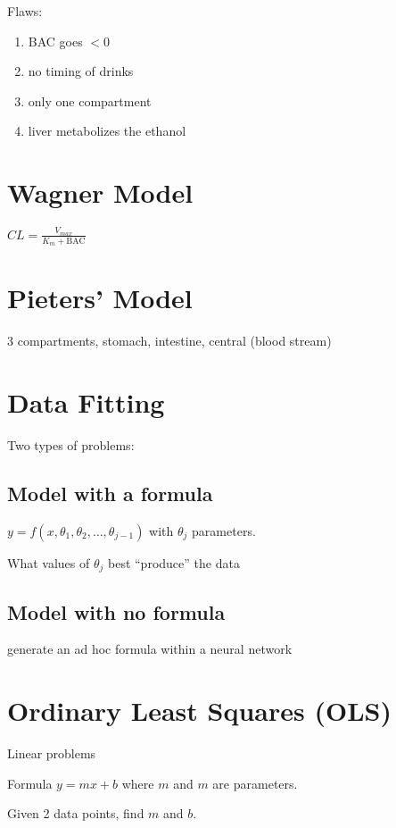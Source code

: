 \documentclass[
	date={October 2{,} 2024},
	month={10},
	day={2}
]{math486notes}
\begin{document}
Flaws:
\begin{enumerate}
	\item BAC goes $< 0$
	\item no timing of drinks
	\item only one compartment
	\item liver metabolizes the ethanol
\end{enumerate}

\section{Wagner Model}\label{sec:wagner-model}
$CL = \frac{V_{max}}{K_{m} + \mbox{BAC}}$

\section{Pieters' Model}\label{sec:pieters-model}
3 compartments, stomach, intestine, central (blood stream)

\section{Data Fitting}\label{sec:data-fitting}
Two types of problems:
\subsection{Model with a formula}\label{subsec:model-with-a-formula}
$y = f(x, \theta_{1}, \theta_{2}, \dots, \theta_{j-1})$ with $\theta_{j}$ parameters.

What values of $\theta_{j}$ best ``produce'' the data

\subsection{Model with no formula}\label{subsec:model-with-no-formula}
generate an ad hoc formula within a neural network

\section{Ordinary Least Squares (OLS)}\label{sec:ordinary-least-squares-(ols)}
Linear problems

\begin{example}
	Formula $y = mx+b$ where $m$ and $m$ are parameters.

	Given 2 data points, find $m$ and $b$.
\end{example}
\end{document}

